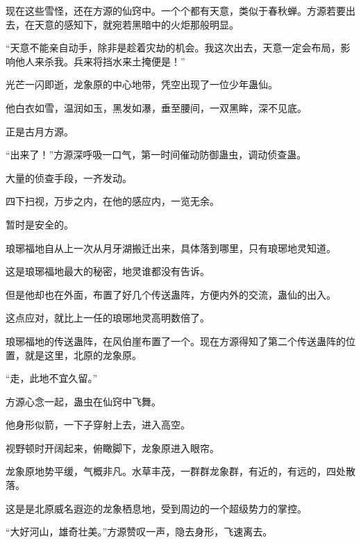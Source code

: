 \begin{this_body}
现在这些雪怪，还在方源的仙窍中。一个个都有天意，类似于春秋蝉。方源若要出去，在天意的感知下，就宛若黑暗中的火炬那般明显。

“天意不能亲自动手，除非是趁着灾劫的机会。我这次出去，天意一定会布局，影响他人来杀我。兵来将挡水来土掩便是！”

光芒一闪即逝，龙象原的中心地带，凭空出现了一位少年蛊仙。

他白衣如雪，温润如玉，黑发如瀑，垂至腰间，一双黑眸，深不见底。

正是古月方源。

“出来了！”方源深呼吸一口气，第一时间催动防御蛊虫，调动侦查蛊。

大量的侦查手段，一齐发动。

四下扫视，万步之内，在他的感应内，一览无余。

暂时是安全的。

琅琊福地自从上一次从月牙湖搬迁出来，具体落到哪里，只有琅琊地灵知道。

这是琅琊福地最大的秘密，地灵谁都没有告诉。

但是他却也在外面，布置了好几个传送蛊阵，方便内外的交流，蛊仙的出入。

这点应对，就比上一任的琅琊地灵高明数倍了。

琅琊福地的传送蛊阵，在风伯崖布置了一个。现在方源得知了第二个传送蛊阵的位置，就是这里，北原的龙象原。

“走，此地不宜久留。”

方源心念一起，蛊虫在仙窍中飞舞。

他身形似箭，一下子穿射上去，进入高空。

视野顿时开阔起来，俯瞰脚下，龙象原进入眼帘。

龙象原地势平缓，气概非凡。水草丰茂，一群群龙象群，有近的，有远的，四处散落。

这是是北原威名遐迩的龙象栖息地，受到周边的一个超级势力的掌控。

“大好河山，雄奇壮美。”方源赞叹一声，隐去身形，飞速离去。

\end{this_body}


